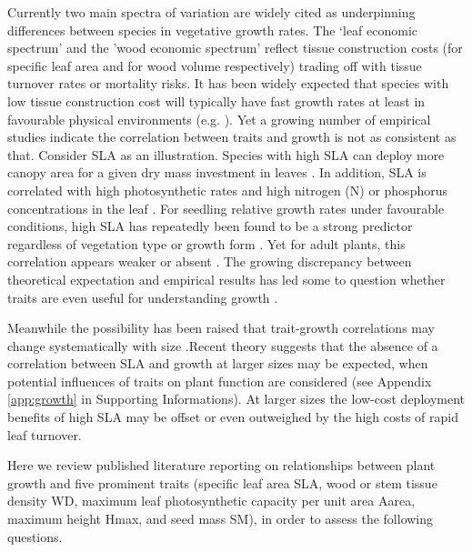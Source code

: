 \documentclass[a4paper]{article}\usepackage[]{graphicx}\usepackage[]{color}
\begin{document}
Currently two main spectra of variation are widely cited as underpinning differences between species in vegetative growth rates. The `leaf economic spectrum' \citep{Wright:2004jb} and the 'wood economic spectrum' \citep{Chave:2009iy} reflect tissue construction costs (for specific leaf area and for wood volume respectively) trading off with tissue turnover rates or mortality risks. It has been widely expected that species with low tissue construction cost will typically have fast growth rates at least in favourable physical environments (e.g. \citealt{MullerLandau:2004dc,Wright:2004jb,Poorter:2008iu,Chave:2009iy,Larjavaara:2010bn,Iida:2012jb,Paine:2015df}). Yet a growing number of empirical studies indicate the correlation between traits and growth is not as consistent as that. Consider SLA as an illustration. Species with high SLA can deploy more canopy area for a given dry mass investment in leaves \citep{Poorter:1999wd, Reich:1992wm}. In addition, SLA is correlated with high photosynthetic rates and high nitrogen (N) or phosphorus concentrations in the leaf \citep{Wright:2004jb}. For seedling relative growth rates under favourable conditions, high SLA has repeatedly been found to be a strong predictor regardless of vegetation type or growth form \citep{Lambers:1992bj,Reich:1992wm,Grime:1997wm,Poorter:1999wd,Wright:1999ds}. Yet for adult plants, this correlation appears weaker or absent \citep{coomes_comparison_1998,Poorter:2008iu,Aiba:2009ft,Easdale:2009gv,Wright:2010tp}. The growing discrepancy between theoretical expectation and empirical results has led some to question whether traits are even useful for understanding growth \citep{Wright:2010tp, Paine:2015df}.

Meanwhile the possibility has been raised that trait-growth correlations may change systematically with size \citep{Iida:2014ep,Iida:2014hq,Ruger:2012jv,Falster:2011ii}.Recent theory suggests that the absence of a correlation between SLA and growth at larger sizes may be expected, when  potential influences of traits on plant function are considered \citep{Falster:2011ii, falster:2013} (see Appendix \ref{app:growth} in Supporting Informations). At larger sizes the low-cost deployment benefits of high SLA may be offset or even outweighed by the high costs of rapid leaf turnover. 

Here we review published literature reporting on relationships between
plant growth and five prominent traits (specific leaf area SLA, wood or stem tissue density WD, maximum leaf photosynthetic capacity per unit area Aarea,  maximum height Hmax, and seed mass SM), in order to assess the following questions.
\end{document}
